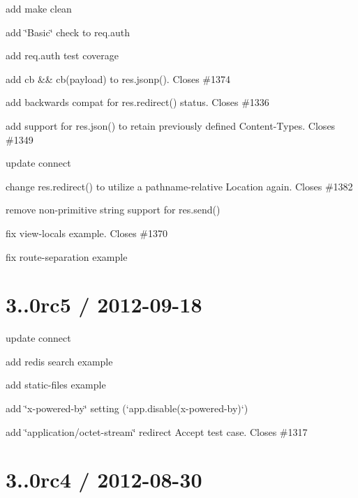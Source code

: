 \begin{DoxyItemize}
\item add {\ttfamily make clean}
\item add \char`\"{}\+Basic\char`\"{} check to req.\+auth
\item add {\ttfamily req.\+auth} test coverage
\item add cb \&\& cb(payload) to {\ttfamily res.\+jsonp()}. Closes \#1374
\item add backwards compat for {\ttfamily res.\+redirect()} status. Closes \#1336
\item add support for {\ttfamily res.\+json()} to retain previously defined Content-\/\+Types. Closes \#1349
\item update connect
\item change {\ttfamily res.\+redirect()} to utilize a pathname-\/relative Location again. Closes \#1382
\item remove non-\/primitive string support for {\ttfamily res.\+send()}
\item fix view-\/locals example. Closes \#1370
\item fix route-\/separation example
\end{DoxyItemize}

\section*{3..\+0rc5 / 2012-\/09-\/18 }


\begin{DoxyItemize}
\item update connect
\item add redis search example
\item add static-\/files example
\item add \char`\"{}x-\/powered-\/by\char`\"{} setting (`app.disable(\textquotesingle{}x-\/powered-\/by\textquotesingle{})`)
\item add \char`\"{}application/octet-\/stream\char`\"{} redirect Accept test case. Closes \#1317
\end{DoxyItemize}

\section*{3..\+0rc4 / 2012-\/08-\/30 }


